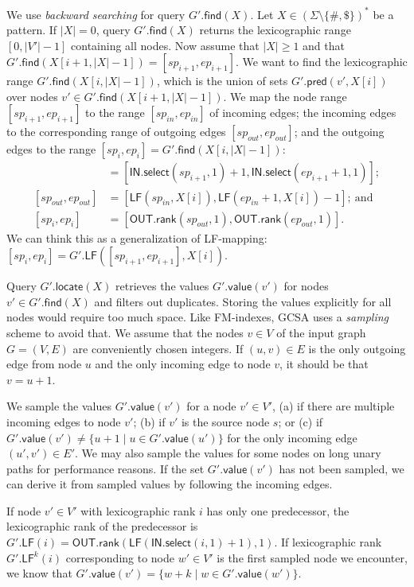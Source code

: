 \documentclass[a4paper,UKenglish]{lipics-v2016}
\newcommand{\set}[1]{\ensuremath{\{ #1 \}}}
\newcommand{\abs}[1]{\ensuremath{\lvert #1 \rvert}}
\newcommand{\rank}{\ensuremath{\mathsf{rank}}}
\newcommand{\select}{\ensuremath{\mathsf{select}}}
\newcommand{\LF}{\ensuremath{\mathsf{LF}}}
\newcommand{\find}{\ensuremath{\mathsf{find}}}
\newcommand{\locate}{\ensuremath{\mathsf{locate}}}
\newcommand{\gpred}{\ensuremath{\mathsf{pred}}}
\newcommand{\gvalue}{\ensuremath{\mathsf{value}}}
\newcommand{\LFmapping}{LF\nobreakdash-mapping}
\newcommand{\patternset}{\ensuremath{(\Sigma \setminus \set{\#, \$})^{\ast}}}
\newcommand{\bvIN}{\ensuremath{\mathsf{IN}}}
\newcommand{\bvOUT}{\ensuremath{\mathsf{OUT}}}
\begin{document}
We use \emph{backward searching} for query $G'.\find(X)$. Let $X \in \patternset$ be a pattern. If $\abs{X} = 0$, query $G'.\find(X)$ returns the lexicographic range $[0, \abs{V'}-1]$ containing all nodes. Now assume that $\abs{X} \ge 1$ and that $G'.\find(X[i+1, \abs{X}-1]) = [sp_{i+1}, ep_{i+1}]$. We want to find the lexicographic range $G'.\find(X[i, \abs{X}-1])$, which is the union of sets $G'.\gpred(v', X[i])$ over nodes $v' \in G'.\find(X[i+1, \abs{X}-1])$. We map the node range $[sp_{i+1}, ep_{i+1}]$ to the range $[sp_{in}, ep_{in}]$ of incoming edges; the incoming edges to the corresponding range of outgoing edges $[sp_{out}, ep_{out}]$; and the outgoing edges to the range $[sp_{i}, ep_{i}] = G'.\find(X[i, \abs{X}-1])$:
\begin{align*}
[sp_{in}, ep_{in}] & = [\bvIN.\select(sp_{i+1}, 1) + 1, \bvIN.\select(ep_{i+1}+1, 1)]; \\
[sp_{out}, ep_{out}] & = [\LF(sp_{in}, X[i]), \LF(ep_{in}+1, X[i]) - 1];\ \textrm{and} \\
[sp_{i}, ep_{i}] & = [\bvOUT.\rank(sp_{out}, 1), \bvOUT.\rank(ep_{out}, 1)].
\end{align*}
We can think this as a generalization of \LFmapping: $[sp_{i}, ep_{i}] = G'.\LF([sp_{i+1}, ep_{i+1}], X[i])$.

Query $G'.\locate(X)$ retrieves the values $G'.\gvalue(v')$ for nodes $v' \in G'.\find(X)$ and filters out duplicates. Storing the values explicitly for all nodes would require too much space. Like FM\nobreakdash-indexes, GCSA uses a \emph{sampling} scheme to avoid that. We assume that the nodes $v \in V$ of the input graph $G = (V, E)$ are conveniently chosen integers. If $(u, v) \in E$ is the only outgoing edge from node $u$ and the only incoming edge to node $v$, it should be that $v = u+1$.

We sample the values $G'.\gvalue(v')$ for a node $v' \in V'$, (a) if there are multiple incoming edges to node $v'$; (b) if $v'$ is the source node $s$; or (c) if $G'.\gvalue(v') \ne \set{u+1 \mid u \in G'.\gvalue(u')}$ for the only incoming edge $(u', v') \in E'$. We may also sample the values for some nodes on long unary paths for performance reasons. If the set $G'.\gvalue(v')$ has not been sampled, we can derive it from sampled values by following the incoming edges.

If node $v' \in V'$ with lexicographic rank $i$ has only one predecessor, the lexicographic rank of the predecessor is $G'.\LF(i) = \bvOUT.\rank(\LF(\bvIN.\select(i, 1) + 1), 1)$. If lexicographic rank $G'.\LF^{k}(i)$ corresponding to node $w' \in V'$ is the first sampled node we encounter, we know that $G'.\gvalue(v') = \set{w+k \mid w \in G'.\gvalue(w')}$.
\end{document}
